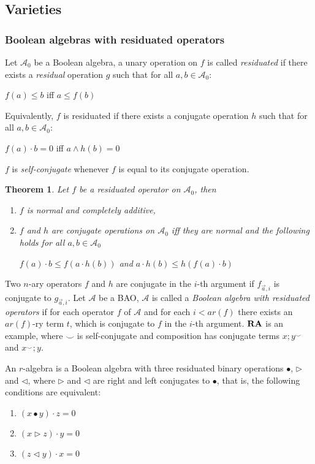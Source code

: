 \documentclass[a4paper]{article}
\theoremstyle{defin}
\theoremstyle{theorem}
\newtheorem{theorem}{Theorem}
\theoremstyle{claim}
\theoremstyle{prop}
\theoremstyle{lemma}
\theoremstyle{fact}
\theoremstyle{ex}
\theoremstyle{col}
\begin{document}
\subsection{Varieties}

\subsubsection{Boolean algebras with residuated operators}

Let $\mathcal{A}_0$ be a Boolean algebra, a unary operation on $f$ is called \emph{residuated} if there exists a \emph{residual} operation $g$ such that for all $a, b \in \mathcal{A}_0$:
\begin{center}
$f(a) \leq b$ iff $a \leq f(b)$
\end{center}
Equivalently, $f$ is residuated if there exists a conjugate operation $h$ such that for all $a, b \in \mathcal{A}_0$:
\begin{center}
$f(a) \cdot b = 0$ iff $a \land h(b) = 0$
\end{center}
$f$ is \emph{self-conjugate} whenever $f$ is equal to its conjugate operation.

\begin{theorem}
Let $f$ be a residuated operator on $\mathcal{A}_0$, then

\begin{enumerate}
\item $f$ is normal and completely additive,
\item $f$ and $h$ are conjugate operations on $\mathcal{A}_0$ iff they are normal and the following holds for all $a, b \in \mathcal{A}_0$
\begin{center}
$f(a) \cdot b \leq f(a \cdot h(b))$ and $a \cdot h(b) \leq h(f(a) \cdot b)$
\end{center}
\end{enumerate}
\end{theorem}
Two $n$-ary operators $f$ and $h$ are conjugate in the $i$-th argument if $f_{\vec{a}, i}$ is conjugate to $g_{\vec{a}, i}$. Let $\mathcal{A}$ be a BAO, $\mathcal{A}$ is called a \emph{Boolean algebra with residuated operators} if for each operator $f$ of $\mathcal{A}$ and for each $i < ar(f)$ there exists an $ar(f)$-ry term $t$, which is conjugate to $f$ in the $i$-th argument. ${\bf RA}$ is an example, where $\smile$ is self-conjugate and composition has conjugate terms $x ; y^{\smile}$ and $x^{\smile} ; y$.

An $r$-algebra is a Boolean algebra with three residuated binary operations $\bullet$, $\triangleright$ and $\triangleleft$, where $\triangleright$ and $\triangleleft$ are right and left conjugates to $\bullet$, that is, the following conditions are equivalent:
\begin{enumerate}
\item $(x \bullet y) \cdot z = 0$
\item $(x \triangleright z) \cdot y = 0$
\item $(z \triangleleft y) \cdot x = 0$
\end{enumerate}
\end{document}
